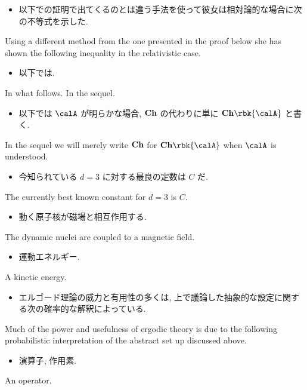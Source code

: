 \documentclass[openany, a4paper, oneside]{jsbook}
\begin{document}
\begin{itemize}
\item 以下での証明で出てくるのとは違う手法を使って彼女は相対論的な場合に次の不等式を示した. \cite{LiebSeiringer1}
\end{itemize}
Using a different method from the one presented in the proof below
she has shown the following inequality in the relativistic case.

\begin{itemize}
\item 以下では. \cite{LiebSeiringer1, CharlesWeibel1}
\end{itemize}
In what follows. In the sequel.

\begin{itemize}
\item 以下では $\calA$ が明らかな場合, $\bf{Ch}$ の代わりに単に $\bf{Ch} \rbk{\calA}$ と書く. \cite{CharlesWeibel1}
\end{itemize}
In the sequel we will merely write $\bf{Ch}$ for $\bf{Ch} \rbk{\calA}$ when $\calA$ is understood.

\begin{itemize}
\item 今知られている $d=3$ に対する最良の定数は $C$ だ. \cite{LiebSeiringer1}
\end{itemize}
The currently best known constant for $d=3$ is $C$.

\begin{itemize}
\item 動く原子核が磁場と相互作用する. \cite{LiebSeiringer1}
\end{itemize}
The dynamic nuclei are coupled to a magnetic field.

\begin{itemize}
\item 運動エネルギー.
\end{itemize}
A kinetic energy.

\begin{itemize}
\item エルゴード理論の威力と有用性の多くは, 上で議論した抽象的な設定に関する次の確率的な解釈によっている. \cite{OmriSarig1}
\end{itemize}
Much of the power and usefulness of ergodic theory is due to
the following probabilistic interpretation of the abstract set up discussed above.

\begin{itemize}
\item 演算子, 作用素.
\end{itemize}
An operator.
\end{document}
